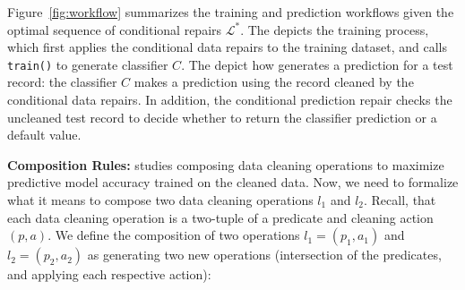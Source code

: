 Figure~\ref{fig:workflow} summarizes the training and prediction workflows given the optimal sequence of conditional repairs $\mathcal{L}^*$.  The  depicts the training process, which first applies the conditional data repairs to the training dataset, and calls \texttt{train()} to generate classifier $C$.  The  depict how \sys generates a prediction for a test record: the classifier $C$ makes a prediction using the record cleaned by the conditional data repairs.  In addition, the conditional prediction repair checks the uncleaned test record to decide whether to return the classifier prediction or a default value.


\iffalse
\vspace{0.25em}
\noindent \textbf{Composition Rules: } \sys studies composing data cleaning operations to maximize predictive model accuracy trained on the cleaned data. Now, we need to formalize what it means to compose two data cleaning operations $l_1$ and $l_2$. Recall, that each data cleaning operation is a two-tuple of a predicate and cleaning action $(p, a)$. We define the composition of two operations $l_1=(p_1, a_1)$ and $l_2=(p_2, a_2)$ as generating two new operations (intersection of the predicates, and applying each respective action):
